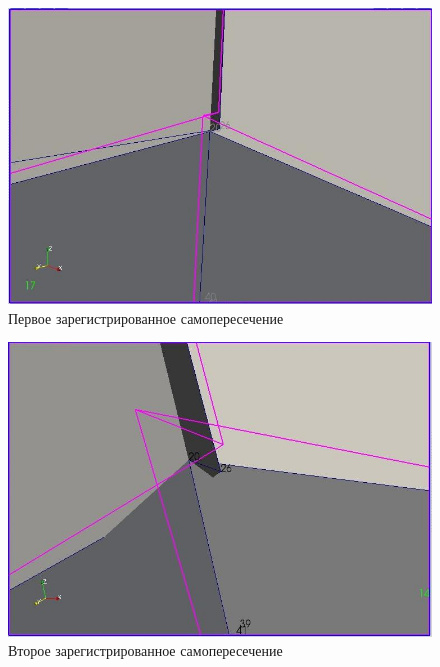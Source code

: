 \documentclass[a4paper,12pt, titlepage]{article}
\begin{document}
\begin{flushleft}
  \begin{figure}[p]
    \includegraphics[clip, width=13cm]{img/consections-1.jpeg}
    \caption{Первое зарегистрированное самопересечение}\label{consections-1}
  \end{figure}
\end{flushleft}
\begin{flushleft}
  \begin{figure}[p]
    \includegraphics[clip, width=13cm]{img/consections-2.jpeg}
    \caption{Второе зарегистрированное самопересечение}\label{consections-2}
  \end{figure}
\end{flushleft}
\end{document}
